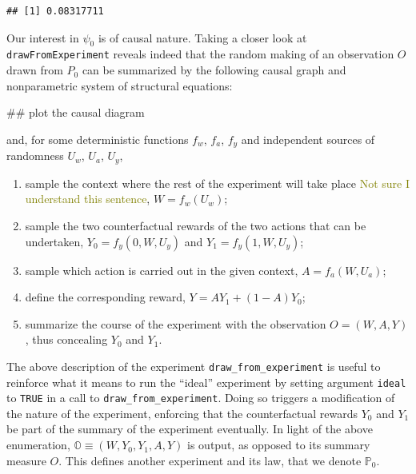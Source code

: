 \documentclass[]{article}
\newenvironment{Shaded}{\begin{snugshade}}{\end{snugshade}}
\newcommand{\NormalTok}[1]{#1}
\newcommand{\bbO}{\mathbb{O}}
\newcommand{\bbP}{\mathbb{P}}
\newcommand{\tcg}[1]{\textcolor{olive}{#1}}
\theoremstyle{definition}
\theoremstyle{definition}
\theoremstyle{definition}
\theoremstyle{remark}
\begin{document}
\begin{verbatim}
## [1] 0.08317711
\end{verbatim}

Our interest in \(\psi_{0}\) is of causal nature. Taking a closer look
at \texttt{drawFromExperiment} reveals indeed that the random making of
an observation \(O\) drawn from \(P_{0}\) can be summarized by the
following causal graph and nonparametric system of structural equations:

\begin{Shaded}
\begin{Highlighting}[]
\NormalTok{## plot the causal diagram}
\end{Highlighting}
\end{Shaded}

and, for some deterministic functions \(f_w\), \(f_a\), \(f_y\) and
independent sources of randomness \(U_w\), \(U_a\), \(U_y\),

\begin{enumerate}
\item sample  the context where the  rest of the experiment
  will take place \tcg{Not sure I understand this sentence}, $W = f_{w}(U_w)$;
\item  sample the  two counterfactual  rewards of  the two
  actions  that   can  be   undertaken,  $Y_{0}  =   f_{y}(0,  W,   U_y)$  and
  $Y_{1} = f_{y}(1, W, U_y)$;
\item\label{item:A:equals} sample   which  action is carried
  out in the given context, $A = f_{a} (W, U_a)$;
\item    define        the    corresponding    reward,
  $Y = A Y_{1} + (1-A) Y_{0}$;
\item summarize the course of the experiment  with the observation $O = (W, A,
  Y)$, thus concealing $Y_{0}$ and $Y_{1}$. 
\end{enumerate}

The above description of the experiment \texttt{draw\_from\_experiment}
is useful to reinforce what it means to run the ``ideal'' experiment by
setting argument \texttt{ideal} to \texttt{TRUE} in a call to
\texttt{draw\_from\_experiment}. Doing so triggers a modification of the
nature of the experiment, enforcing that the counterfactual rewards
\(Y_{0}\) and \(Y_{1}\) be part of the summary of the experiment
eventually. In light of the above enumeration,
\(\bbO \equiv (W, Y_{0}, Y_{1}, A, Y)\) is output, as opposed to its
summary measure \(O\). This defines another experiment and its law, that
we denote \(\bbP_{0}\).
\end{document}
